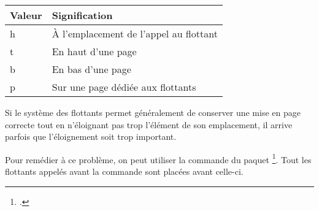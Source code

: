 \begin{longtable}{|l|l|}
    \hline
    Valeur & Signification    \\
    \hline
    \endhead
    \hline
    \endfoot
    h     & À l'emplacement de l'appel au flottant     \\
    t     & En haut d'une page                \\
    b     & En bas d'une page                \\
    p     & Sur une page dédiée aux flottants        \\
\end{longtable}


Si le système des flottants permet généralement de conserver une mise en page correcte tout en n'éloignant pas trop l'élément de son emplacement, il arrive parfois que l'éloignement soit trop important.

Pour remédier à ce problème, on peut utiliser la commande  du paquet \footcite{placeins}. 
Tout les flottants appelés avant la commande sont placées avant celle-ci.






    
